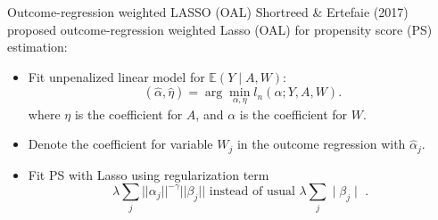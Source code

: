 \documentclass[t]{beamer}
\begin{document}
\begin{frame}{Outcome-regression weighted LASSO (OAL)}
Shortreed \& Ertefaie (2017) proposed outcome-regression weighted Lasso (OAL) for propensity score (PS) estimation:
\begin{itemize}
  \item  Fit unpenalized linear model for $\mathbb{E}(Y \mid A,W)$:
  $$(\hat{\alpha}, \hat{\eta}) = \arg\min_{\alpha,\eta} l_n(\alpha;Y,A,W).$$
where $\eta$ is the coefficient for $A$, and $\alpha$ is the coefficient for $W$.
\item Denote the coefficient for variable $W_j$ in the outcome regression with $\hat{\alpha}_j$.
\item Fit PS with Lasso using regularization term
\[
  \lambda \sum_j ||\alpha_j||^{-\gamma} ||\beta_j || \mbox{ instead of usual $\lambda \sum_j \mid \beta_j\mid$ \ . }
\]
\end{itemize}
\end{frame}
\end{document}
